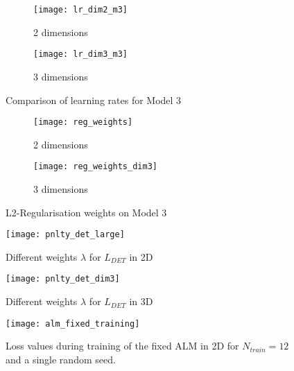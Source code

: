 
\label{appendix}

\begin{figure}[H]
	\centering
	\begin{subfigure}{.5\textwidth}
		\centering
		\texttt{[image: lr\_dim2\_m3]}
		\caption{2 dimensions}
	\end{subfigure}%
	\begin{subfigure}{.5\textwidth}
		\centering
		\texttt{[image: lr\_dim3\_m3]}
		\caption{3 dimensions}
	\end{subfigure}
	\caption{Comparison of learning rates for Model 3}
	\label{fig:comp_lr_m3}
\end{figure}

\begin{figure}[H]
	\centering
	\begin{subfigure}{.5\textwidth}
		\centering
		\texttt{[image: reg\_weights]}
		\caption{2 dimensions}
	\end{subfigure}%
	\begin{subfigure}{.5\textwidth}
		\centering
		\texttt{[image: reg\_weights\_dim3]}
		\caption{3 dimensions}
	\end{subfigure}
	\caption{L2-Regularisation weights on Model 3}
	\label{fig:reg_weights}
\end{figure}


\begin{figure}[H]
	\centering
	\texttt{[image: pnlty\_det\_large]}
	\caption{Different weights $\lambda$ for $L_{DET}$ in 2D}
	\label{fig:pnlty_det_large}
\end{figure}

\begin{figure}[H]
	\centering
	\texttt{[image: pnlty\_det\_dim3]}
	\caption{Different weights $\lambda$ for $L_{DET}$ in 3D}
	\label{fig:pnlty_det_dim3}
\end{figure}

\begin{figure}[H]
\centering
\texttt{[image: alm\_fixed\_training]}
\caption{Loss values during training of the fixed ALM in 2D for $N_{train} = 12$ and a single random seed.}
\label{fig:alm_fixed_training}
\end{figure}

